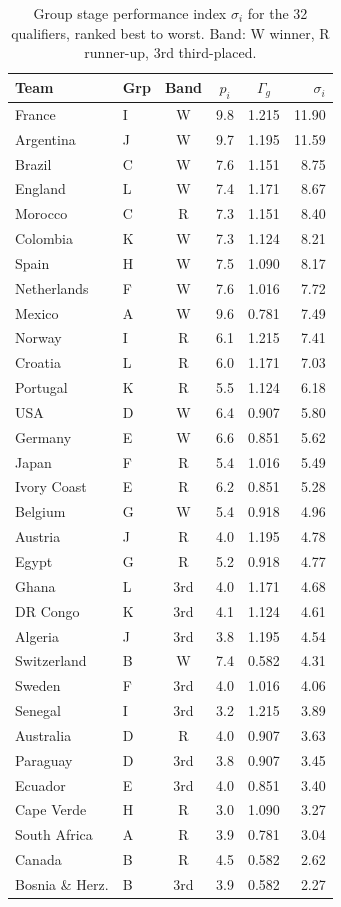 \documentclass[11pt]{article}
\newcommand{\str}{\sigma}            %
\begin{document}
\begin{table}[htbp]
\centering
\caption{Group stage performance index $\str_i$ for the 32 qualifiers, ranked best to worst. Band: W winner, R runner-up, 3rd third-placed.}
\label{tab:sigma}
\begin{tabular}{@{}llcccr@{}}
\toprule
Team & Grp & Band & $p_i$ & $\Gamma_g$ & $\str_i$ \\
\midrule
France & I & W & 9.8 & 1.215 & 11.90 \\
Argentina & J & W & 9.7 & 1.195 & 11.59 \\
Brazil & C & W & 7.6 & 1.151 & 8.75 \\
England & L & W & 7.4 & 1.171 & 8.67 \\
Morocco & C & R & 7.3 & 1.151 & 8.40 \\
Colombia & K & W & 7.3 & 1.124 & 8.21 \\
Spain & H & W & 7.5 & 1.090 & 8.17 \\
Netherlands & F & W & 7.6 & 1.016 & 7.72 \\
Mexico & A & W & 9.6 & 0.781 & 7.49 \\
Norway & I & R & 6.1 & 1.215 & 7.41 \\
Croatia & L & R & 6.0 & 1.171 & 7.03 \\
Portugal & K & R & 5.5 & 1.124 & 6.18 \\
USA & D & W & 6.4 & 0.907 & 5.80 \\
Germany & E & W & 6.6 & 0.851 & 5.62 \\
Japan & F & R & 5.4 & 1.016 & 5.49 \\
Ivory Coast & E & R & 6.2 & 0.851 & 5.28 \\
Belgium & G & W & 5.4 & 0.918 & 4.96 \\
Austria & J & R & 4.0 & 1.195 & 4.78 \\
Egypt & G & R & 5.2 & 0.918 & 4.77 \\
Ghana & L & 3rd & 4.0 & 1.171 & 4.68 \\
DR Congo & K & 3rd & 4.1 & 1.124 & 4.61 \\
Algeria & J & 3rd & 3.8 & 1.195 & 4.54 \\
Switzerland & B & W & 7.4 & 0.582 & 4.31 \\
Sweden & F & 3rd & 4.0 & 1.016 & 4.06 \\
Senegal & I & 3rd & 3.2 & 1.215 & 3.89 \\
Australia & D & R & 4.0 & 0.907 & 3.63 \\
Paraguay & D & 3rd & 3.8 & 0.907 & 3.45 \\
Ecuador & E & 3rd & 4.0 & 0.851 & 3.40 \\
Cape Verde & H & R & 3.0 & 1.090 & 3.27 \\
South Africa & A & R & 3.9 & 0.781 & 3.04 \\
Canada & B & R & 4.5 & 0.582 & 2.62 \\
Bosnia \& Herz. & B & 3rd & 3.9 & 0.582 & 2.27 \\
\bottomrule
\end{tabular}
\end{table}
\end{document}
